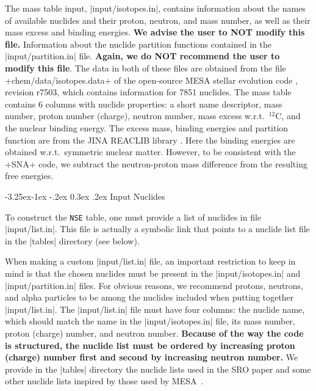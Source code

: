 \documentclass[letterpaper,11pt]{refart}
\makeatletter
\renewcommand\subsubsection{\@startsection{subsubsection}{3}{\z@}%
                           {-3.25ex\@plus -1ex \@minus -.2ex}%
                           {0.3ex \@plus .2ex}%
                           {\normalfont\normalsize\bf\fontsize{11}{13}\selectfont}}
\makeatother
\begin{document}
The mass table input,
\verbfile|input/isotopes.in|, contains information about the names of
available nuclides and their proton, neutron, and mass number, as well
as their mass excess and binding energies.  \textbf{We advise the user
  to NOT modify this file.}  Information about the nuclide partition
functions contained in the \verbfile|input/partition.in| file.
\textbf{Again, we do NOT recommend the user to modify this file}.  The
data in both of these files are obtained from the file
\verbfile+chem/data/isotopes.data+ of the open-source MESA stellar
evolution code \cite{MESA}, revision r7503, which contains information
for 7851 nuclides.  The mass table contains 6 columns with nuclide
properties: a short name descriptor, mass number, proton number
(charge), neutron number, mass excess w.r.t.\ $^{12}$C, and the nuclear
binding energy.  The excess mass, binding energies and partition
function are from the JINA REACLIB library
\cite{cyburt:10}. Here the binding energies are obtained
  w.r.t.\ symmetric nuclear matter. However, to be consistent with the
\verbexec+SNA+ code, we subtract the neutron-proton mass
difference from the resulting free energies.


\subsubsection{Input Nuclides}\label{sssec:NSE_isotopes}


To construct the \texttt{NSE} table, one must provide a list of
nuclides in file
\verbfile|input/list.in|. This file is actually a symbolic link
that points to a nuclide list file in the  \verbfile|tables|
directory (see below).

When making a custom \verbfile|input/list.in| file, an important
restriction to keep in mind is that the chosen nuclides must be
present in the
\verbfile|input/isotopes.in| and \verbfile|input/partition.in| files.
For obvious reasons, we recommend protons, neutrons, and alpha
particles to be among the nuclides included when putting together
\verbfile|input/list.in|.  The \verbfile|input/list.in| file must have
four columns: the nuclide name, which should match the name in the
\verbfile|input/isotopes.in| file, its mass number, proton (charge)
number, and neutron number.  \textbf{Because of the way the code is
  structured, the nuclide list must be ordered by increasing proton
  (charge) number first and second by increasing neutron number.}  We
provide in the
\verbfile|tables| directory the nuclide lists used in the SRO paper 
and some other nuclide lists inspired by those used by MESA~\cite{MESA}.
\end{document}
